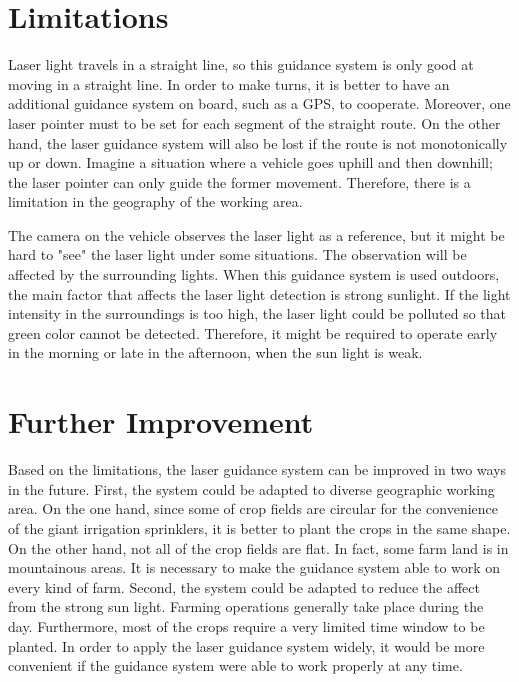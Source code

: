 \documentclass[letterpaper,12pt,oneside]{book}
\begin{document}
		
		\section{Limitations}
		Laser light travels in a straight line, so this guidance system is only good at moving in a straight line. In order to make turns, it is better to have an additional guidance system on board, such as a GPS, to cooperate. Moreover, one laser pointer must to be set for each segment of the straight route. On the other hand, the laser guidance system will also be lost if the route is not monotonically up or down. Imagine a situation where a vehicle goes uphill and then downhill; the laser pointer can only guide the former movement. Therefore, there is a limitation in the geography of the working area.
		
		The camera on the vehicle observes the laser light as a reference, but it might be hard to "see" the laser light under some situations. The observation will be affected by the surrounding lights. When this guidance system is used outdoors, the main factor that affects the laser light detection is strong sunlight. If the light intensity in the surroundings is too high, the laser light could be polluted so that green color cannot be detected. Therefore, it might be required to operate early in the morning or late in the afternoon, when the sun light is weak. 
		
		\section{Further Improvement}
		Based on the limitations, the laser guidance system can be improved in two ways in the future. First, the system could be adapted to diverse geographic working area. On the one hand, since some of crop fields are circular for the convenience of the giant irrigation sprinklers, it is better to plant the crops in the same shape. On the other hand, not all of the crop fields are flat. In fact, some farm land is in mountainous areas. It is necessary to make the guidance system able to work on every kind of farm. Second, the system could be adapted to reduce the affect from the strong sun light. Farming operations generally take place during the day. Furthermore, most of the crops require a very limited time window to be planted. In order to apply the laser guidance system widely, it would be more convenient if the guidance system were able to work properly at any time. 
		
		
		
		

\end{document}
